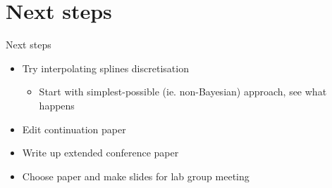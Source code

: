 \documentclass[presentation]{beamer}
\begin{document}
\section{Next steps}
\label{sec:orge5e60dd}
\begin{frame}[label={sec:org79c935b}]{Next steps}
\begin{itemize}
\item Try interpolating splines discretisation
\begin{itemize}
\item Start with simplest-possible (ie. non-Bayesian) approach, see what happens
\end{itemize}
\end{itemize}
\vfill
\begin{itemize}
\item Edit continuation paper
\end{itemize}
\vfill
\begin{itemize}
\item Write up extended conference paper
\end{itemize}
\vfill
\begin{itemize}
\item Choose paper and make slides for lab group meeting
\end{itemize}
\end{frame}
\end{document}

